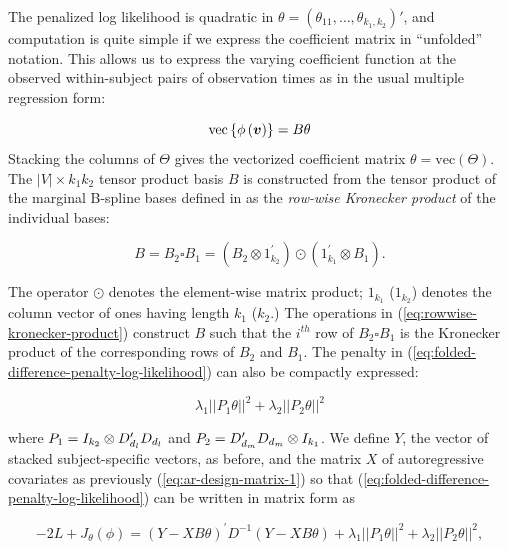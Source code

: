 \vspace{0.5cm}

The penalized log likelihood is quadratic in $\theta = \left(\theta_{11}, \dots, \theta_{k_1, k_2} \right)'$, and computation is quite simple if we express the coefficient matrix in ``unfolded'' notation. This allows us to express the varying coefficient function at the observed within-subject pairs of observation times as in the usual multiple regression form:

\begin{equation*}
\mbox{vec}\left\{\phi\left( \mbox{\boldmath $v$} \right)\right\} = B \theta
\end{equation*}
\noindent
Stacking the columns of $\Theta$ gives the vectorized coefficient matrix $\theta = \mbox{vec}\left( \Theta \right)$. The $\vert V \vert \times k_1 k_2$ tensor product basis $B$ is constructed from the tensor product of the marginal B-spline bases defined in \citet{eilers2006fast} as the \textit{row-wise Kronecker product} of the individual bases:

\begin{equation} \label{eq:rowwise-kronecker-product}
B = B_2 \square B_1 = \left( B_2 \otimes 1^\prime_{k_2} \right) \odot \left(1^\prime_{k_1} \otimes  B_1  \right).
\end{equation}

\noindent
The operator $\odot$ denotes the element-wise matrix product; $1_{k_1}$ ($1_{k_2}$) denotes the column vector of ones having length $k_1$ ($k_2$.) The operations in (\ref{eq:rowwise-kronecker-product}) construct $B$ such that the $i^{th}$ row of $B_2\square B_1$ is the Kronecker product of the corresponding rows of $B_2$ and $B_1$. The penalty in (\ref{eq:folded-difference-penalty-log-likelihood}) can also be compactly expressed:

\begin{equation*} \label{eq:tensor-product-penalty}
\lambda_1 \vert \vert P_1 \theta \vert \vert^2 + \lambda_2 \vert \vert P_2 \theta \vert\vert^2
\end{equation*}

\noindent
where $P_1 = I_{k_2} \otimes D'_{d_{\scriptscriptstyle l}} D_{d_{\scriptscriptstyle l}} $ and $P_2 =  D'_{d_{\scriptscriptstyle m}} D_{d_{\scriptscriptstyle m}} \otimes I_{k_1}$. We define $Y$, the vector of stacked subject-specific vectors,  as before, and the matrix $X$ of autoregressive covariates as previously (\ref{eq:ar-design-matrix-1}) so that (\ref{eq:folded-difference-penalty-log-likelihood}) can be written in matrix form as

\begin{equation} \label{eq:tensor-pspline-objective-function}
-2L + J_\theta\left(\phi\right) = \left( Y - XB\theta\right)^\prime D^{-1}\left( Y - XB\theta\right)  + \lambda_1\vert\vert P_1 \theta \vert\vert^2 + \lambda_2 \vert\vert P_2 \theta\vert \vert^2,
\end{equation}

